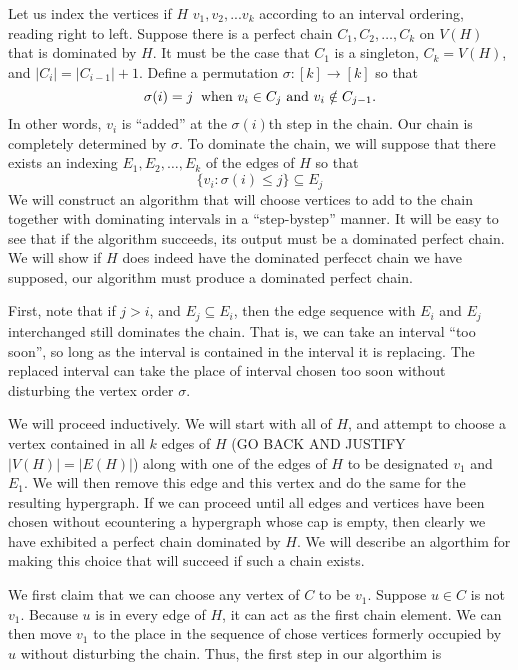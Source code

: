 Let us index the vertices if $H$ $v_1, v_2,...v_k$ according to an interval ordering, reading right to left.
%
Suppose there is a perfect chain $C_1, C_2, \ldots, C_k$ on $V(H)$ that is dominated by $H$.  
%
It must be the case that $C_1$ is a singleton, $C_k = V(H)$, and $|C_i| = |C_{i-1}| + 1$.  
%
Define a permutation $\sigma : [k] \rightarrow [k]$ so that 
\[\sigma(i) = j \:\makebox{ when $v_i \in C_j$ and $v_i \notin C_{j-1}$}.\]
%
In other words, $v_i$ is ``added'' at the $\sigma(i)$th step in the chain.
%
Our chain is completely determined by $\sigma$.
%
To dominate the chain, we will suppose that there exists an indexing $E_1, E_2, \ldots, E_k$ of the edges of $H$ so that 
\[\{v_i : \sigma(i) \leq j\} \subseteq E_j\]
%
 We will construct an algorithm that will choose vertices to add to the chain together with dominating intervals in a ``step-bystep'' manner.
%
It will be easy to see that if the algorithm succeeds, its output must be a dominated perfect chain.
%
We will show if $H$ does indeed have the dominated perfecct chain we have supposed, our algorithm must produce a dominated perfect chain.

First, note that if $j > i$, and $E_j \subseteq E_i$, then the edge sequence with $E_i$ and $E_j$ interchanged still dominates the chain. 
%
That is, we can take an interval ``too soon'', so long as the interval is contained in the interval it is replacing. 
%
The replaced interval can take the place of interval chosen too soon without disturbing the vertex order $\sigma$. 

We will proceed inductively.  We will start with all of $H$, and attempt to choose a vertex contained in all $k$  edges of $H$ (GO BACK AND JUSTIFY $|V(H)| = |E(H)|$) along with one of the edges of $H$ to be designated $v_1$ and $E_1$.  
%
We will then remove this edge and this vertex and do the same for the resulting hypergraph.    
%
If we can proceed until all edges and vertices have been chosen without ecountering a hypergraph whose cap is empty, then clearly we have exhibited a perfect chain dominated by $H$.
%
We will describe an algorthim for making this choice that will succeed if such a chain exists.

We first claim that we can choose any vertex of $C$ to be $v_1$.  
%
Suppose $u \in C$ is not $v_1$.  
%
Because $u$ is in every edge of $H$, it can act as the first chain element.  
%
We can then move $v_1$ to the place in the sequence of chose vertices formerly occupied by $u$ without disturbing the chain.  
%
Thus, the first step in our algorthim is

